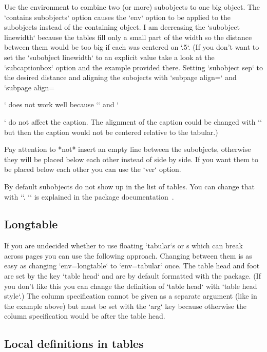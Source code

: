 Use the  environment to combine two (or more) subobjects to one big object.
The `contains subobjects` option causes the `env` option to be applied to the subobjects instead of the containing object.
I am decreasing the `subobject linewidth` because the tables fill only a small part of the width
so the distance between them would be too big if each was centered on `.5\linewidth`.
(If you don't want to set the `subobject linewidth` to an explicit value take a look at the `subcaptionbox` option and the example provided there.
 Setting `subobject sep` to the desired distance and aligning the subojects with `subpage align=\raggedleft` and `subpage align=\raggedright` does not work well because `\raggedleft` and `\raggedright` do not affect the caption. The alignment of the caption could be changed with `\captionsetup{justification=raggedleft,singlelinecheck=false}` but then the caption would not be centered relative to the tabular.)

Pay attention to *not* insert an empty line between the subobjects, otherwise they will be placed below each other instead of side by side.
If you want them to be placed below each other you can use the `ver` option.

By default subobjects do not show up in the list of tables.
You can change that with `\captionsetup[sub]{list=true}`.
`\captionsetup` is explained in the  package documentation~\autocite{caption}.



\subsection{Longtable}
\label{longtable}
If you are undecided whether to use floating `tabular`s or s which can break across pages you can use the following approach.
Changing between them is as easy as changing `env=longtable` to `env=tabular` once.
The table head and foot are set by the key `table head` and are by default formatted with the  package.
(If you don't like this you can change the definition of `table head` with `table head style`.)
The column specification cannot be given as a separate argument (like in the example above) but must be set with the `arg` key
because otherwise the column specification would be after the table head.



\subsection{Local definitions in tables}
\label{local-definitions-in-tables}

